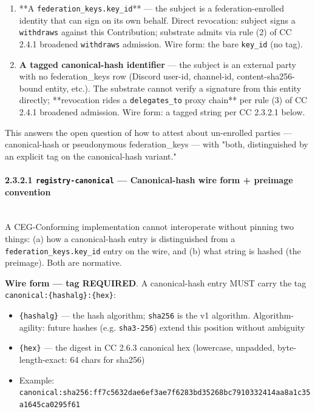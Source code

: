\documentclass[11pt]{article}
\begin{document}
\begin{enumerate}\setlength\itemsep{0pt}
\item **A \texttt{federation\_keys.key\_id}** — the subject is a federation-enrolled identity that can sign on its own behalf. Direct revocation: subject signs a \texttt{withdraws} against this Contribution; substrate admits via rule (2) of CC 2.4.1 broadened \texttt{withdraws} admission. Wire form: the bare \texttt{key\_id} (no tag).
\item \textbf{A tagged canonical-hash identifier} — the subject is an external party with no federation\_keys row (Discord user-id, channel-id, content-sha256-bound entity, etc.). The substrate cannot verify a signature from this entity directly; **revocation rides a \texttt{delegates\_to} proxy chain** per rule (3) of CC 2.4.1 broadened admission. Wire form: a tagged string per CC 2.3.2.1 below.
\end{enumerate}


This answers the open question of how to attest about un-enrolled parties — canonical-hash or pseudonymous federation\_keys — with "both, distinguished by an explicit tag on the canonical-hash variant."


\paragraph{2.3.2.1 \texttt{registry-canonical} — Canonical-hash wire form + preimage convention}\mbox{}\\


A CEG-Conforming implementation cannot interoperate without pinning two things: (a) how a canonical-hash entry is distinguished from a \texttt{federation\_keys.key\_id} entry on the wire, and (b) what string is hashed (the preimage). Both are normative.


\textbf{Wire form — tag REQUIRED}. A canonical-hash entry MUST carry the tag \texttt{canonical:\{hashalg\}:\{hex\}}:


\begin{itemize}\setlength\itemsep{0pt}
\item \texttt{\{hashalg\}} — the hash algorithm; \texttt{sha256} is the v1 algorithm. Algorithm-agility: future hashes (e.g. \texttt{sha3-256}) extend this position without ambiguity
\item \texttt{\{hex\}} — the digest in CC 2.6.3 canonical hex (lowercase, unpadded, byte-length-exact: 64 chars for sha256)
\item Example: \texttt{canonical:sha256:ff7c5632dae6ef3ae7f6283bd35268bc7910332414aa8a1c35a1645ca0295f61}
\end{itemize}
\end{document}
